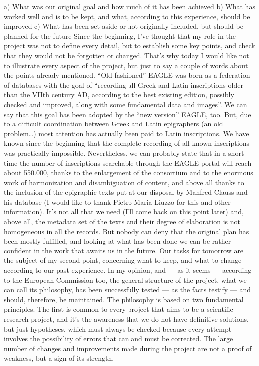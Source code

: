 a) What was our original goal and how much of it has been achieved
b) What has worked well and is to be kept, and what, according to this experience, should be improved
c) What has been set aside or not originally included, but should be planned for the future
Since the beginning, I’ve thought that my role in the project was not to define every detail, but to establish some key points, and check that they would not be forgotten or changed. That’s why today I would like not to illustrate every aspect of the project, but just to say a couple of words about the points already mentioned.
``Old fashioned'' EAGLE was born as a federation of databases with the goal of ``recording all Greek and Latin inscriptions older than the VIIth century AD, according to the best existing edition, possibly checked and improved, along with some fundamental data and images''. We can say that this goal has been adopted by the ``new version'' EAGLE, too. But, due to a difficult coordination between Greek and Latin epigraphers (an old problem…) most attention has actually been paid to Latin inscriptions. We have known since the beginning that the complete recording of all known inscriptions was practically impossible. Nevertheless, we can probably state that in a short time the number of inscriptions searchable through the EAGLE portal will reach about 550.000, thanks to the enlargement of the consortium and to the enormous work of harmonization and disambiguation of content, and above all thanks to the inclusion of the epigraphic texts put at our disposal by Manfred Clauss and his database (I would like to thank Pietro Maria Liuzzo for this and other information).
It’s not all that we need (I’ll come back on this point later) and, above all, the metadata set of the texts and their degree of elaboration is not homogeneous in all the records. But nobody can deny that the original plan has been mostly fulfilled, and looking at what has been done we can be rather confident in the work that awaits us in the future.
Our tasks for tomorrow are the subject of my second point, concerning what to keep, and what to change according to our past experience. In my opinion, and --- as it seems --- according to the European Commission too, the general structure of the project, what we can call its philosophy, has been successfully tested --- as the facts testify --- and should, therefore, be maintained. The philosophy is based on two fundamental principles.
The first is common to every project that aims to be a scientific research project, and it’s the awareness that we do not have definitive solutions, but just hypotheses, which must always be checked because every attempt involves the possibility of errors that can and must be corrected. The large number of changes and improvements made during the project are not a proof of weakness, but a sign of its strength.
